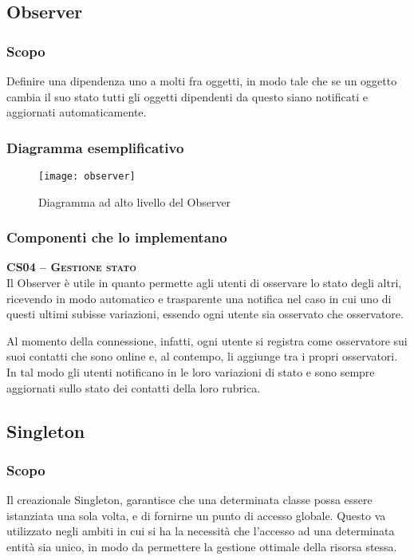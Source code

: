 \subsection{Observer}

\subsubsection{Scopo}
Definire una dipendenza uno a molti fra oggetti, in modo tale che se un oggetto cambia il suo stato tutti gli oggetti dipendenti da questo siano notificati e aggiornati automaticamente.

\subsubsection{Diagramma esemplificativo}
\begin{figure}[H]
  \centering
  \texttt{[image: observer]}
  \caption{Diagramma ad alto livello del  Observer}\label{fig:observer}
\end{figure}

\subsubsection{Componenti che lo implementano}
\begin{description}
  \item{\scshape\bfseries CS04 -- Gestione stato}\\
Il  Observer è utile in quanto permette agli utenti di osservare lo stato degli altri, ricevendo in modo automatico e trasparente una notifica nel caso in cui uno di questi ultimi subisse variazioni, essendo ogni utente sia osservato che osservatore.

Al momento della connessione, infatti, ogni utente si registra come osservatore sui suoi contatti che sono online e, al contempo, li aggiunge tra i propri osservatori. In tal modo gli utenti notificano in  le loro variazioni di stato e sono sempre aggiornati sullo stato dei contatti della loro rubrica.
\end{description}

\subsection{Singleton}

\subsubsection{Scopo}
Il  creazionale Singleton, garantisce che una determinata classe possa essere istanziata una sola volta, e di fornirne un punto di accesso globale. Questo  va utilizzato negli ambiti in cui si ha la necessità che l'accesso ad una determinata entità sia unico, in modo da permettere la gestione ottimale della risorsa stessa.

